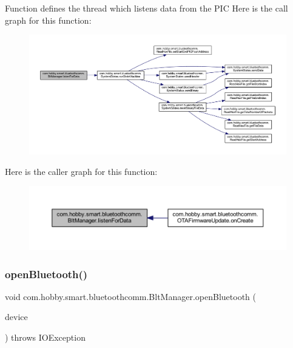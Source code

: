 Function defines the thread which listens data from the P\+IC Here is the call graph for this function\+:\nopagebreak
\begin{figure}[H]
\begin{center}
\leavevmode
\includegraphics[width=350pt]{classcom_1_1hobby_1_1smart_1_1bluetoothcomm_1_1_blt_manager_ab2ec59deffb80584481167ce99ff6b40_cgraph}
\end{center}
\end{figure}
Here is the caller graph for this function\+:\nopagebreak
\begin{figure}[H]
\begin{center}
\leavevmode
\includegraphics[width=350pt]{classcom_1_1hobby_1_1smart_1_1bluetoothcomm_1_1_blt_manager_ab2ec59deffb80584481167ce99ff6b40_icgraph}
\end{center}
\end{figure}
\mbox{\label{classcom_1_1hobby_1_1smart_1_1bluetoothcomm_1_1_blt_manager_ae6274af1cc3ee13291cc8ef6f365a92f}} 
\subsubsection{\texorpdfstring{open\+Bluetooth()}{openBluetooth()}}
{\footnotesize\ttfamily void com.\+hobby.\+smart.\+bluetoothcomm.\+Blt\+Manager.\+open\+Bluetooth (\begin{DoxyParamCaption}\item[{Bluetooth\+Device}]{device }\end{DoxyParamCaption}) throws I\+O\+Exception}

